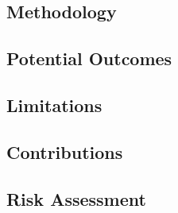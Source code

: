 \subsection{Methodology}

\subsection{Potential Outcomes}

\subsection{Limitations}

\subsection{Contributions}

\subsection{Risk Assessment}